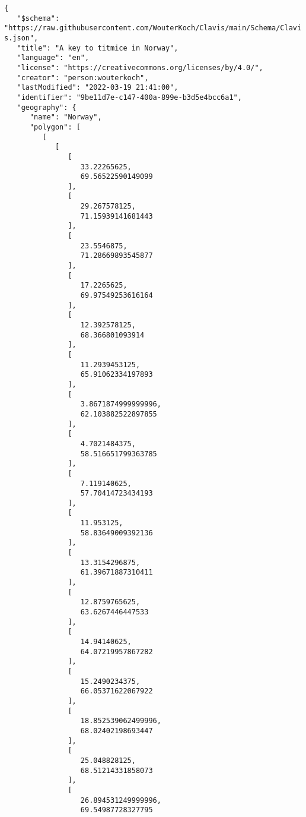 \documentclass[10pt,letterpaper]{article}
\begin{document}
\vspace*{0.2in}

\begin{flushleft}
{\Large
\textbf{}}
\newline
\end{flushleft}
\linenumbers
\begin{verbatim}
{
   "$schema":
"https://raw.githubusercontent.com/WouterKoch/Clavis/main/Schema/Clavi
s.json",
   "title": "A key to titmice in Norway",
   "language": "en",
   "license": "https://creativecommons.org/licenses/by/4.0/",
   "creator": "person:wouterkoch",
   "lastModified": "2022-03-19 21:41:00",
   "identifier": "9be11d7e-c147-400a-899e-b3d5e4bcc6a1",
   "geography": {
      "name": "Norway",
      "polygon": [
         [
            [
               [
                  33.22265625,
                  69.56522590149099
               ],
               [
                  29.267578125,
                  71.15939141681443
               ],
               [
                  23.5546875,
                  71.28669893545877
               ],
               [
                  17.2265625,
                  69.97549253616164
               ],
               [
                  12.392578125,
                  68.366801093914
               ],
               [
                  11.2939453125,
                  65.91062334197893
               ],
               [
                  3.8671874999999996,
                  62.103882522897855
               ],
               [
                  4.7021484375,
                  58.516651799363785
               ],
               [
                  7.119140625,
                  57.70414723434193
               ],
               [
                  11.953125,
                  58.83649009392136
               ],
               [
                  13.3154296875,
                  61.39671887310411
               ],
               [
                  12.8759765625,
                  63.6267446447533
               ],
               [
                  14.94140625,
                  64.07219957867282
               ],
               [
                  15.2490234375,
                  66.05371622067922
               ],
               [
                  18.852539062499996,
                  68.02402198693447
               ],
               [
                  25.048828125,
                  68.51214331858073
               ],
               [
                  26.894531249999996,
                  69.54987728327795

\end{verbatim}
\end{document}
